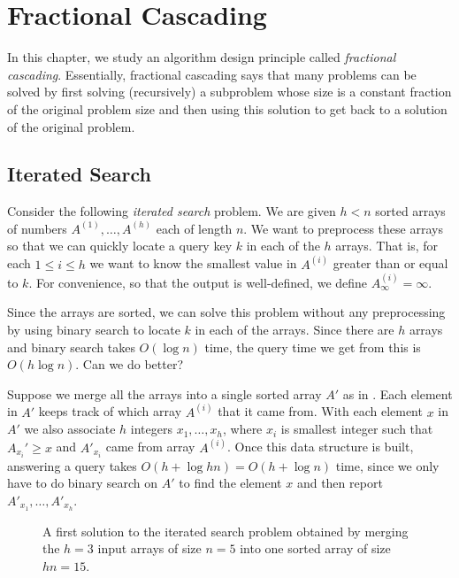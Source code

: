 
\chapter{Fractional Cascading}


In this chapter, we study an algorithm design principle called
\emph{fractional cascading}.  Essentially, fractional cascading says
that many problems can be solved by first solving (recursively) a
subproblem whose size is a constant fraction of the original problem
size and then using this solution to get back to a solution of the
original problem.


\section{Iterated Search}

Consider the following \emph{iterated search} problem.  We are given
$h<n$ sorted arrays of numbers $A^{(1)},\ldots,A^{(h)}$ each of length
$n$.  We want to preprocess these arrays so that we can quickly locate
a query key $k$ in each of the $h$ arrays.  That is, for each $1\le
i\le h$ we want to know the smallest value in $A^{(i)}$ greater than
or equal to $k$.  For convenience, so that the output is well-defined,
we define $A^{(i)}_{\infty}=\infty$.


Since the arrays are sorted, we can solve this problem without any
preprocessing by using binary search to locate $k$ in each of the
arrays.  Since there are $h$ arrays and binary search takes $O(\log
n)$ time, the query time we get from this is $O(h\log n)$.  Can we do
better?

Suppose we merge all the arrays into a single sorted array $A'$ as in
.  Each element in $A'$ keeps track of which array
$A^{(i)}$ that it came from.  With each element $x$ in $A'$ we also
associate $h$ integers $x_1,\ldots,x_h$, where $x_i$ is smallest
integer such that $A_{x_i}'\ge x$ and $A'_{x_i}$ came from array
$A^{(i)}$.  Once this data structure is built, answering a query takes
$O(h+\log hn)=O(h+\log n)$ time, since we only have to do binary
search on $A'$ to find the element $x$ and then report
$A'_{x_1},\ldots,A'_{x_h}$.

\begin{figure}
\caption{A first solution to the iterated search problem obtained by
	merging the $h=3$ input arrays of size $n=5$ into one sorted
	array of size $hn=15$.}
\end{figure}

